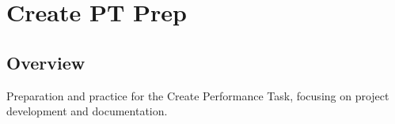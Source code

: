 \chapter{Create PT Prep}

\section*{Overview}
Preparation and practice for the Create Performance Task, focusing on project development and documentation.


